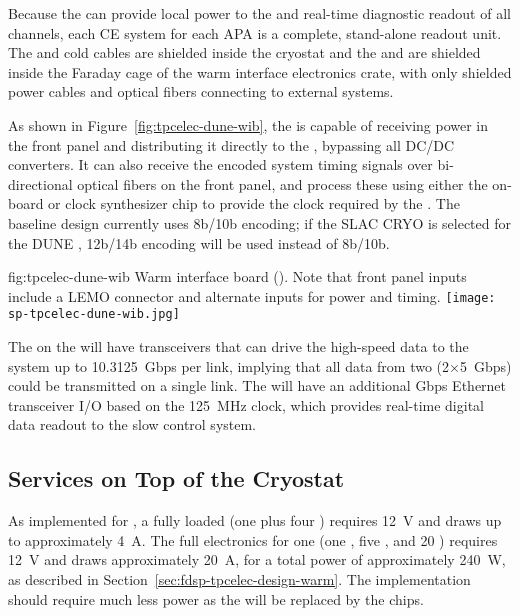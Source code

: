 Because the  can provide local power to the  and real-time diagnostic readout of all channels,
each CE system for each APA is a complete, stand-alone readout unit. The  and cold cables are shielded
inside the cryostat and the  and  are shielded inside the Faraday cage of the warm interface
electronics crate, with only shielded power cables and optical fibers connecting to external systems.

As shown in Figure~\ref{fig:tpcelec-dune-wib}, the  is capable of receiving  power in the front panel and distributing it directly to the , bypassing all DC/DC converters.
It can also receive the encoded system timing signals over bi-directional optical
fibers on the front panel, and process these using either
the on-board  or clock synthesizer chip to provide the clock required by the .
The baseline  design currently uses 8b/10b encoding; if the SLAC CRYO  is selected for
the DUNE , 12b/14b encoding will be used instead of 8b/10b.

\begin{dunefigure}
{fig:tpcelec-dune-wib}
{Warm interface board (). Note that front panel inputs include a LEMO connector and alternate inputs for  power and timing.}
\texttt{[image: sp-tpcelec-dune-wib.jpg]}
\end{dunefigure}

The  on the  will have
transceivers that can drive the high-speed data to the  system up to
10.3125~Gbps per link, implying that all data from
two  (2$\times$5~Gbps) could be transmitted on a single link.
The  will have an additional Gbps Ethernet transceiver I/O based on the \SI{125}{MHz} clock, which 
provides real-time digital data readout to the slow control system.

\subsection{Services on Top of the Cryostat}
\label{sec:fdsp-tpcelec-design-services}

As implemented for , a fully loaded  (one  plus four ) requires
\SI{12}{V} and draws up to approximately \SI{4}{A}. The full electronics for one  (one , five , and \num{20} ) 
requires \SI{12}{V} and draws approximately \SI{20}{A}, for a total power of approximately \SI{240}{W}, as 
described in Section~\ref{sec:fdsp-tpcelec-design-warm}. The  implementation should require much 
less power as the  will be replaced by the  chips.

